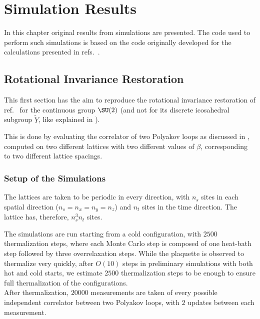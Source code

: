 \pagestyle{myFancy}
\chapter{Simulation Results\label{Chap:SimulationResults}}
In this chapter original results from simulations are presented.
The code used to perform such simulations is based on the code originally developed for the calculations presented in refs.~\cite{Panero:2009tv,Mykkanen:2012ri}.

\section{Rotational Invariance Restoration\label{Sec4:RotInv}}
This first section has the aim to reproduce the rotational invariance restoration of ref.~\cite{Lang:1982tj} for the continuous group $\SU(2)$ (and not for its discrete icosahedral subgroup $\tilde{Y}$, like explained in ).

This is done by evaluating the correlator of two Polyakov loops as discussed in , computed on two different lattices with two different values of $\beta$, corresponding to two different lattice spacings.

\subsection{Setup of the Simulations}
The lattices are taken to be periodic in every direction, with $n_s$ sites in each spatial direction ($n_s=n_x=n_y=n_z$) and $n_t$ sites in the time direction.
The lattice has, therefore, $n_s^3n_t$ sites.

The simulations are run starting from a cold configuration, with $2500$ thermalization steps, where each Monte Carlo step is composed of one heat-bath step followed by three overrelaxation steps.
While the plaquette is observed to thermalize very quickly, after $O(10)$ steps in preliminary simulations with both hot and cold starts, we estimate $2500$ thermalization steps to be enough to ensure full thermalization of the configurations.\\
After thermalization, $20000$ measurements are taken of every possible independent correlator between two Polyakov loops, with $2$ updates between each measurement.

